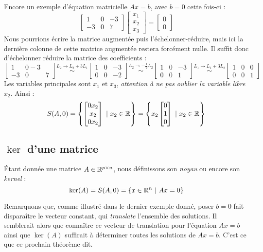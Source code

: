 Encore un exemple d'équation matricielle $Ax = b$, avec $b = 0$ cette fois-ci :
$$
\begin{bmatrix}
1 & 0  & -3\\
-3 & 0 & 7
\end{bmatrix}
\begin{bmatrix}
x_1 \\ x_2 \\x_3
\end{bmatrix}
=
\begin{bmatrix}
0 \\ 0
\end{bmatrix}
$$
Nous pourrions écrire la matrice augmentée puis l'échelonner-réduire, mais ici la dernière colonne de cette matrice augmentée restera forcément nulle. Il suffit donc d'échelonner réduire la matrice des coefficients :
$$
\begin{bmatrix}
1 & 0 - 3\\
-3 & 0 & 7
\end{bmatrix}
\overset{L_2 \to L_2 + 3L_1}{\sim}
\begin{bmatrix}
1 & 0 & - 3\\
0 & 0 & -2
\end{bmatrix}
\overset{L_2 \to -\frac{1}{2}L_2}{\sim}
\begin{bmatrix}
1 & 0 & -3\\
0 & 0 & 1
\end{bmatrix}
\overset{L_1 \to L_1 + 3L_2}{\sim}
\begin{bmatrix}
1 & 0 & 0\\
0 & 0 & 1
\end{bmatrix}
$$
Les variables principales sont $x_1$ et $x_3$, \textit{attention à ne pas oublier la variable libre $x_2$}. Ainsi :
$$
S(A,0) = \left\{
\begin{bmatrix}
0x_2 \\ x_2 \\ 0x_2
\end{bmatrix} \ | \ x_2 \in \mathbb{R}
\right\} =  \left\{
x_2\begin{bmatrix}
0 \\ 1 \\ 0
\end{bmatrix} \ | \ x_2 \in \mathbb{R}
\right\}
$$

\subsection{$\ker$ d'une matrice}
\begin{boxdef}
Étant donnée une matrice $A \in \mathbb{R}^{p \times n}$, nous définissons son \textit{noyau} ou encore son \textit{kernel} :
$$
\ker(A) = S(A,0) = \left\{x \in \mathbb{R}^n \ | \ Ax = 0\right\}
$$
\end{boxdef}
Remarquons que, comme illustré dans le dernier exemple donné, poser $b = 0$ fait disparaître le vecteur constant, qui \textit{translate} l'ensemble des solutions. Il semblerait alors que connaître ce vecteur de translation pour l'équation $Ax=b$ ainsi que $\ker(A)$ suffirait à déterminer toutes les solutions de $Ax=b$. C'est ce que ce prochain théorème dit.\\

